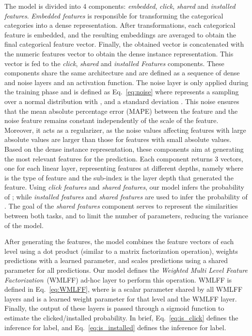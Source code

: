 \documentclass[manuscript,nonacm]{acmart}
\begin{document}
The model is divided into 4 components: \textit{embedded}, \textit{click}, \textit{shared} and \textit{installed} \textit{features}. \textit{Embedded features} is responsible for transforming the categorical categories into a dense representation. After transformations, each categorical feature is embedded, and the resulting embeddings are averaged to obtain the final categorical feature vector. Finally, the obtained vector is concatenated with the numeric features vector to obtain the dense instance representation. This vector is fed to the \textit{click}, \textit{shared} and \textit{installed Features} components. These components share the same architecture and are defined as a sequence of dense and noise layers and an activation function. The noise layer is only applied during the training phase and is defined as Eq.~\ref{eq:noise} where  represents a sampling over a normal distribution with , and a standard deviation . This noise ensures that the mean absolute percentage error (MAPE) between the feature and the noise feature remains constant independently of the scale of the feature. Moreover, it acts as a regularizer, as the noise values affecting features with large absolute values are larger than those for features with small absolute values. Based on the dense instance representation, these components aim at generating the most relevant features for the prediction. Each component returns 3 vectors, one for each linear layer, representing features at different depths, namely  where  is the type of feature and the sub-index is the layer depth that generated the feature. Using \textit{click features} and \textit{shared features}, our model infers the probability of ; while \textit{installed features} and \textit{shared features} are used to infer the probability of . The goal of the \textit{shared features} component serves to represent the similarities between both tasks, and to limit the number of parameters, reducing the variance of the model.\vspace{-0.3cm} 



After generating the features, the model combines the feature vectors of each level using a dot product (similar to a matrix factorization operation), weights predictions with a learned parameter, and scales predictions using a shared parameter for all predictions. Our model defines the \textit{Weighted Multi Level Feature Factorization}~(WMLFF) ad-hoc layer to perform this operation. WMLFF is defined in Eq.~\ref{eq:WMLFF}, where  is a scalar parameter shared by all WMLFF layers and  is a learned weight parameter for that level and the WMLFF layer. Finally, the output of these layers is passed through a sigmoid function to estimate the clicked/installed probability. In brief, Eq.~\ref{eq:is_click} defines the inference for  label, and Eq.~\ref{eq:is_installed} defines the inference for  label.\vspace{-0.3cm}
\end{document}

